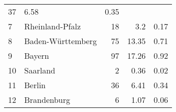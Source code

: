 \begin{longtable}{lXrrr}
       \num{37} &
       \num[round-mode=places,round-precision=2]{6.58} &
         \num[round-mode=places,round-precision=2]{0.35} \\

     7 &
     \multicolumn{1}{X}{ Rheinland-Pfalz   } &


       \num{18} &
       \num[round-mode=places,round-precision=2]{3.2} &
         \num[round-mode=places,round-precision=2]{0.17} \\

     8 &
     \multicolumn{1}{X}{ Baden-Württemberg   } &


       \num{75} &
       \num[round-mode=places,round-precision=2]{13.35} &
         \num[round-mode=places,round-precision=2]{0.71} \\

     9 &
     \multicolumn{1}{X}{ Bayern   } &


       \num{97} &
       \num[round-mode=places,round-precision=2]{17.26} &
         \num[round-mode=places,round-precision=2]{0.92} \\

     10 &
     \multicolumn{1}{X}{ Saarland   } &


       \num{2} &
       \num[round-mode=places,round-precision=2]{0.36} &
         \num[round-mode=places,round-precision=2]{0.02} \\

     11 &
     \multicolumn{1}{X}{ Berlin   } &


       \num{36} &
       \num[round-mode=places,round-precision=2]{6.41} &
         \num[round-mode=places,round-precision=2]{0.34} \\

     12 &
     \multicolumn{1}{X}{ Brandenburg   } &


       \num{6} &
       \num[round-mode=places,round-precision=2]{1.07} &
         \num[round-mode=places,round-precision=2]{0.06} \\


\end{longtable}
